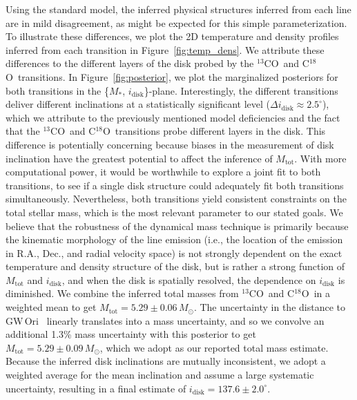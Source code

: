 \documentclass[twocolumn]{aastex61}
\newcommand{\gw}{GW\,Ori}
\newcommand{\thirteen}{${}^{13}$CO}
\newcommand{\eighteen}{C${}^{18}$O}
\begin{document}
Using the standard model, the inferred physical structures inferred from each line are in mild disagreement, as might be expected for this simple parameterization. To illustrate these differences, we plot the 2D temperature and density profiles inferred from each transition in Figure~\ref{fig:temp_dens}. We attribute these differences to the different layers of the disk probed by the \thirteen\ and \eighteen\ transitions. In Figure~\ref{fig:posterior}, we plot the marginalized posteriors for both transitions in the \{$M_\ast$, $i_\mathrm{disk}$\}-plane. Interestingly, the different transitions deliver different inclinations at a statistically significant level ($\Delta i_\mathrm{disk} \approx 2.5^\circ$), which we attribute to the previously mentioned model deficiencies and the fact that the \thirteen\ and \eighteen\ transitions probe different layers in the disk.
This difference is potentially concerning because biases in the measurement of disk inclination have the greatest potential to affect the inference of $M_\mathrm{tot}$. With more computational power, it would be worthwhile to explore a joint fit to both transitions, to see if a single disk structure could adequately fit both transitions simultaneously.
Nevertheless, both transitions yield consistent constraints on the total stellar mass, which is the most relevant parameter to our stated goals. We believe that the robustness of the dynamical mass technique is primarily because the kinematic morphology of the line emission (i.e., the location of the emission in R.A., Dec., and radial velocity space) is not strongly dependent on the exact temperature and density structure of the disk, but is rather a strong function of $M_\mathrm{tot}$ and $i_\mathrm{disk}$, and when the disk is spatially resolved, the dependence on $i_\mathrm{disk}$ is diminished. We combine the inferred total masses from \thirteen\ and \eighteen\ in a weighted mean to get $M_\mathrm{tot} = 5.29 \pm 0.06\,M_\odot$. The uncertainty in the distance to \gw\ \citep[$388 \pm 5\,$pc;][]{kounkel17} linearly translates into a mass uncertainty, and so we convolve an additional 1.3\% mass uncertainty with this posterior to get  $M_\mathrm{tot} = 5.29 \pm 0.09\,M_\odot$, which we adopt as our reported total mass estimate. Because the inferred disk inclinations are mutually inconsistent, we adopt a weighted average for the mean inclination and assume a large systematic uncertainty, resulting in a final estimate of $i_\mathrm{disk} = 137.6 \pm 2.0^\circ$.
\end{document}
